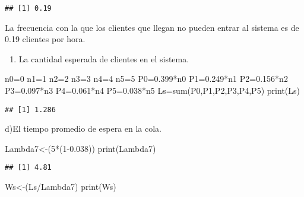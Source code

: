 \documentclass[
]{article}
\newenvironment{Shaded}{\begin{snugshade}}{\end{snugshade}}
\newcommand{\DecValTok}[1]{\textcolor[rgb]{0.00,0.00,0.81}{#1}}
\newcommand{\FloatTok}[1]{\textcolor[rgb]{0.00,0.00,0.81}{#1}}
\newcommand{\FunctionTok}[1]{\textcolor[rgb]{0.00,0.00,0.00}{#1}}
\newcommand{\NormalTok}[1]{#1}
\newcommand{\OtherTok}[1]{\textcolor[rgb]{0.56,0.35,0.01}{#1}}
\newcommand{\SpecialCharTok}[1]{\textcolor[rgb]{0.00,0.00,0.00}{#1}}
\providecommand{\tightlist}{%
  \setlength{\itemsep}{0pt}\setlength{\parskip}{0pt}}
\begin{document}
\begin{verbatim}
## [1] 0.19
\end{verbatim}

La frecuencia con la que los clientes que llegan no pueden entrar al
sistema es de 0.19 clientes por hora.

\begin{enumerate}
\def\labelenumi{\alph{enumi})}
\setcounter{enumi}{2}
\tightlist
\item
  La cantidad esperada de clientes en el sistema.
\end{enumerate}

\begin{Shaded}
\begin{Highlighting}[]
\NormalTok{n0}\OtherTok{=}\DecValTok{0}
\NormalTok{n1}\OtherTok{=}\DecValTok{1}
\NormalTok{n2}\OtherTok{=}\DecValTok{2}
\NormalTok{n3}\OtherTok{=}\DecValTok{3}
\NormalTok{n4}\OtherTok{=}\DecValTok{4}
\NormalTok{n5}\OtherTok{=}\DecValTok{5}
\NormalTok{P0}\OtherTok{=}\FloatTok{0.399}\SpecialCharTok{*}\NormalTok{n0}
\NormalTok{P1}\OtherTok{=}\FloatTok{0.249}\SpecialCharTok{*}\NormalTok{n1}
\NormalTok{P2}\OtherTok{=}\FloatTok{0.156}\SpecialCharTok{*}\NormalTok{n2}
\NormalTok{P3}\OtherTok{=}\FloatTok{0.097}\SpecialCharTok{*}\NormalTok{n3}
\NormalTok{P4}\OtherTok{=}\FloatTok{0.061}\SpecialCharTok{*}\NormalTok{n4}
\NormalTok{P5}\OtherTok{=}\FloatTok{0.038}\SpecialCharTok{*}\NormalTok{n5}
\NormalTok{Ls}\OtherTok{=}\FunctionTok{sum}\NormalTok{(P0,P1,P2,P3,P4,P5)}
\FunctionTok{print}\NormalTok{(Ls)}
\end{Highlighting}
\end{Shaded}

\begin{verbatim}
## [1] 1.286
\end{verbatim}

d)El tiempo promedio de espera en la cola.

\begin{Shaded}
\begin{Highlighting}[]
\NormalTok{Lambda7}\OtherTok{\textless{}{-}}\NormalTok{(}\DecValTok{5}\SpecialCharTok{*}\NormalTok{(}\DecValTok{1}\FloatTok{{-}0.038}\NormalTok{))}
\FunctionTok{print}\NormalTok{(Lambda7)}
\end{Highlighting}
\end{Shaded}

\begin{verbatim}
## [1] 4.81
\end{verbatim}

\begin{Shaded}
\begin{Highlighting}[]
\NormalTok{Ws}\OtherTok{\textless{}{-}}\NormalTok{(Ls}\SpecialCharTok{/}\NormalTok{Lambda7)}
\FunctionTok{print}\NormalTok{(Ws)}
\end{Highlighting}
\end{Shaded}
\end{document}
